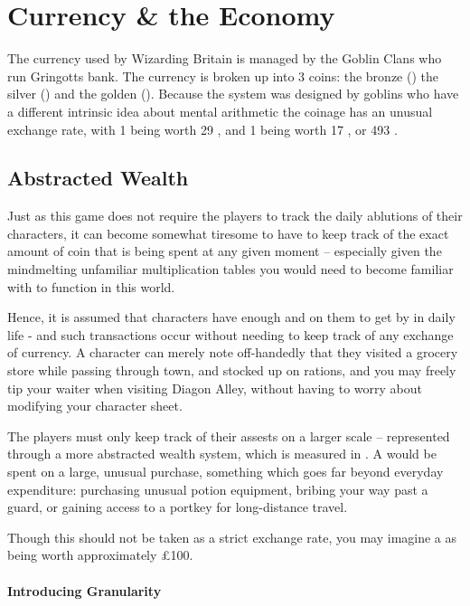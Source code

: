 
\chapter{Currency \& the Economy} \label{S:Money}

The currency used by Wizarding Britain is managed by the Goblin Clans who run Gringotts bank. The currency is broken up into 3 coins: the bronze  (\knut{})\comma{} the silver  (\sickle{}) and the golden  (\galleon{}). Because the system was designed by goblins \minus{} who have a different intrinsic idea about mental arithmetic \minus{} the coinage has an unusual exchange rate, with 1  being worth 29 , and 1  being worth 17 , or 493 . 


\section{Abstracted Wealth}

Just as this game does not require the players to track the daily ablutions of their characters, it can become somewhat tiresome to have to keep track of the exact amount of coin that is being spent at any given moment -- especially given the mindmelting unfamiliar multiplication tables you would need to become familiar with to function in this world. 

Hence, it is assumed that characters have enough  and  on them to get by in daily life - and such transactions occur without needing to keep track of any exchange of currency. A character can merely note off-handedly that they visited a grocery store while passing through town, and stocked up on rations, and you may freely tip your waiter when visiting Diagon Alley, without having to worry about modifying your character sheet.

The players must only keep track of their assests on a larger scale -- represented through a more abstracted wealth system, which is measured in . A  would be spent on a large, unusual purchase, something which goes far beyond everyday expenditure: purchasing unusual potion equipment, bribing your way past a guard, or gaining access to a portkey for long-distance travel. 

Though this should not be taken as a strict exchange rate, you may imagine a  as being worth approximately £100.

\subsubsection{Introducing Granularity}

